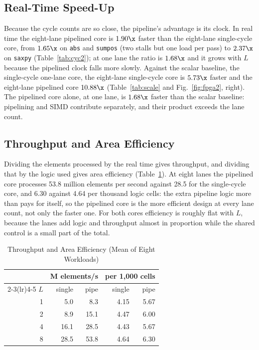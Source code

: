 \subsection{Real-Time Speed-Up}
Because the cycle counts are so close, the pipeline's advantage is its clock. In real
time the eight-lane pipelined core is $1.90\x$ faster than the eight-lane single-cycle
core, from $1.65\x$ on \texttt{abs} and \texttt{sumpos} (two stalls but one load per pass) to
$2.37\x$ on \texttt{saxpy} (Table~\ref{tab:cyc2}); at one lane the ratio is $1.68\x$ and it grows
with $L$ because the pipelined clock falls more slowly. Against the scalar baseline, the
single-cycle one-lane core, the eight-lane single-cycle core is $5.73\x$ faster and the
eight-lane pipelined core $10.88\x$ (Table~\ref{tab:scale} and
Fig.~\ref{fig:fpga2}, right). The pipelined core alone, at one lane, is $1.68\x$ faster
than the scalar baseline: pipelining and SIMD contribute separately, and their product
exceeds the lane count.

\subsection{Throughput and Area Efficiency}
Dividing the elements processed by the real time gives throughput, and dividing that by
the logic used gives area efficiency (Table~\ref{tab:eff}). At eight lanes the pipelined
core processes 53.8 million elements per second against 28.5 for the single-cycle core,
and 6.30 against 4.64 per thousand logic cells: the extra pipeline logic more than pays
for itself, so the pipelined core is the more efficient design at every lane count, not
only the faster one. For both cores efficiency is roughly flat with $L$, because the
lanes add logic and throughput almost in proportion while the shared control is a small
part of the total.

\begin{table}[t]
\centering
\caption{Throughput and Area Efficiency (Mean of Eight Workloads)}
\label{tab:eff}
\footnotesize
\begin{tabular}{@{}rrrrr@{}}
\toprule
 & \multicolumn{2}{c}{M elements/s} & \multicolumn{2}{c}{per 1,000 cells} \\
\cmidrule(lr){2-3}\cmidrule(lr){4-5}
$L$ & single & pipe & single & pipe \\
\midrule
1 & 5.0  & 8.3  & 4.15 & 5.67 \\
2 & 8.9  & 15.1 & 4.47 & 6.00 \\
4 & 16.1 & 28.5 & 4.43 & 5.67 \\
8 & 28.5 & 53.8 & 4.64 & 6.30 \\
\bottomrule
\end{tabular}
\end{table}

